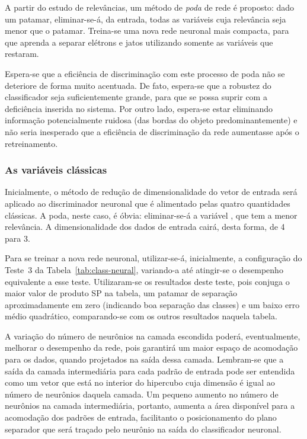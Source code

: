 A partir do estudo de relevâncias, um método de \emph{poda} de rede é proposto:
dado um patamar, eliminar-se-á, da entrada, todas as variáveis cuja relevância
seja menor que o patamar. Treina-se uma nova rede neuronal mais compacta, para
que aprenda a separar elétrons e jatos utilizando somente as variáveis que
restaram.

Espera-se que a eficiência de discriminação com este processo de poda não se
deteriore de forma muito acentuada. De fato, espera-se que a robustez do
classificador seja suficientemente grande, para que se possa suprir com a
deficiência inserida no sistema. Por outro lado, espera-se estar eliminando
informação potencialmente ruidosa (das bordas do objeto predominantemente) e
não seria inesperado que a eficiência de discriminação da rede aumentasse após
o retreinamento.

\subsubsection{As variáveis clássicas}

Inicialmente, o método de redução de dimensionalidade do vetor de entrada será
aplicado ao discriminador neuronal que é alimentado pelas quatro quantidades
clássicas. A poda, neste caso, é óbvia: eliminar-se-á a variável \rstrip, que
tem a menor relevância. A dimensionalidade dos dados de entrada cairá, desta
forma, de 4 para 3.

Para se treinar a nova rede neuronal, utilizar-se-á, inicialmente, a
configuração do Teste~3 da Tabela~\ref{tab:class-neural}, variando-a até
atingir-se o desempenho equivalente a esse teste. Utilizaram-se os resultados
deste teste, pois conjuga o maior valor de produto SP na tabela, um patamar de
separação aproximadamente em zero (indicando boa separação das classes) e um
baixo erro médio quadrático, comparando-se com os outros resultados naquela
tabela.

A variação do número de neurônios na camada escondida poderá, eventualmente,
melhorar o desempenho da rede, pois garantirá um maior espaço de acomodação
para os dados, quando projetados na saída dessa camada. Lembram-se que a saída
da camada intermediária para cada padrão de entrada pode ser entendida como um
vetor que está no interior do hipercubo cuja dimensão é igual ao número de
neurônios daquela camada. Um pequeno aumento no número de neurônios na camada
intermediária, portanto, aumenta a área disponível para a acomodação dos
padrões de entrada, facilitanto o posicionamento do plano separador que será
traçado pelo neurônio na saída do classificador neuronal.

